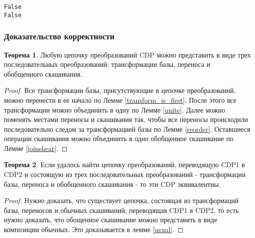 \documentclass[fontsize=14pt]{scrartcl}
\theoremstyle{definition}
\newtheorem{theorem}{Теорема}[section]
\begin{document}
\begin{lstlisting}[style=output]
False
False
\end{lstlisting}


\subsubsection{Доказательство корректности}

\begin{theorem}
	Любую цепочку преобразований CDP можно представить в виде трех последовательных преобразований: трансформации базы, переноса и обобщенного скашивания.
\end{theorem}
\begin{proof}
	Все трансформации базы, присутствующие в цепочке преобразований, можно перенести в ее начало по Лемме \ref{transform_is_first}. После этого все трансформации можно объединить в одну по Лемме \ref{unite}. Далее можно поменять местами переносы и скашивания так, чтобы все переносы происходили последовательно следом за трансформацией базы по Лемме \ref{reorder}. Оставшиеся операции скашивания можно объединить в одно обобщенное скашивание по Лемме \ref{joinshear}.
\end{proof}

\begin{theorem}
	Если удалось найти цепочку преобразований, переводящую CDP1 в CDP2 и состоящую из трех последовательных преобразований - трансформации базы, переноса и обобщенного скашивания - то эти CDP эквивалентны.
\end{theorem}
\begin{proof}
	Нужно доказать, что существует цепочка, состоящая из трансформаций базы, переносов и обычных скашиваний, переводящая CDP1 в CDP2, то есть нужно доказать, что обощенное скашивание можно представить в виде композиции обычных. Это доказывается в лемме \ref{usual}.
\end{proof}
\end{document}

